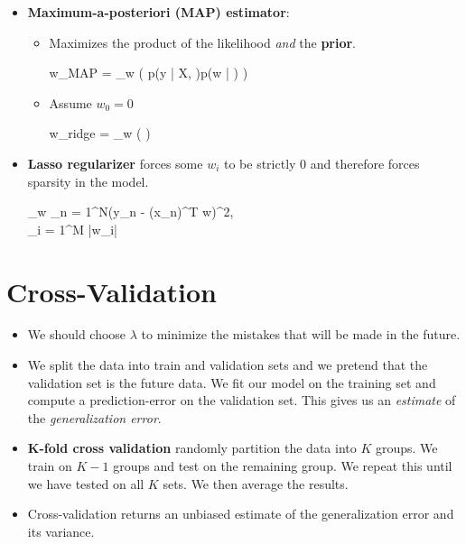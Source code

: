 \begin{itemize}
    \item \textbf{Maximum-a-posteriori (MAP) estimator}: %
	     \begin{itemize}
	     	\item Maximizes the product of the likelihood \textit{and} the \textbf{prior}.
	     	\begin{myalign*}
	     	     \bm w_{MAP} = \argmax_{\bm w} 
	     	     \left(
	     	     	p(\*y | \*X, \bm \Lambda)p(\bm w | \bm \Sigma)
	     	     \right)
	     	 \end{myalign*} 
	     	\item Assume $w_0 = 0$
	     	\begin{myalign*}
	     	    \bm w_{ridge} = \argmax_{\bm w}
	     	    \left(
		     	    \log 
		     	    \left[
		     	    	\prod_{n = 1}^N \N(y_n | \*x^T_n \bm w, \bm \Lambda) \times \N(\bm w | 0, \*I)
		     	    \right]
		     	\right)
	     	\end{myalign*}
	     \end{itemize}
	\item \textbf{Lasso regularizer} forces some $w_i$ to be strictly 0 and therefore forces sparsity in the model.
	\begin{myalign*}
	    \min_{\bm w}  \sum_{n = 1}^N(y_n - \bm{\tilde{\phi}}(\*x_n)^T \bm w)^2, \hspace{10pt} \\ \sum_{i = 1}^M |w_i| \leq \tau
	\end{myalign*}
\end{itemize}


\section{Cross-Validation}
\begin{itemize}
	\item We should choose $\lambda$ to minimize the mistakes that will be made in the future.
	\item We split the data into train and validation sets and we pretend that the validation set is the future data. We fit our model on the training set and compute a prediction-error on the validation set. This gives us an \textit{estimate} of the \textit{generalization error}.
	\item \textbf{K-fold cross validation} randomly partition the data into $K$ groups. We train on $K - 1$ groups and test on the remaining group. We repeat this until we have tested on all $K$ sets. We then average the results.
	\item Cross-validation returns an unbiased estimate of the generalization error and its variance.
\end{itemize}

